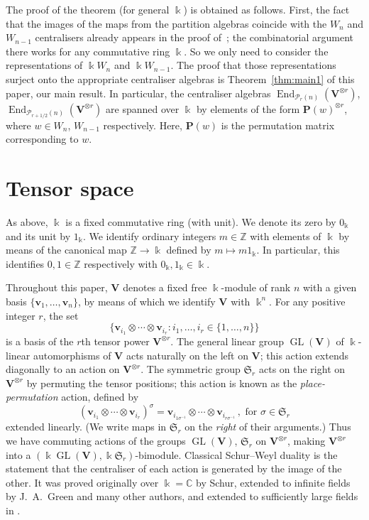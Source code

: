 \documentclass[10pt]{article}
\theoremstyle{definition}
\DeclareMathOperator{\GL}{GL}
\DeclareMathOperator{\End}{End}
\newcommand{\Z}{\mathbb{Z}}
\newcommand{\C}{\mathbb{C}}
\newcommand{\Sym}{\mathfrak{S}}
\newcommand{\Ptn}{\mathcal{P}}
\newcommand{\bP}{\mathbf{P}}
\newcommand{\V}{\mathbf{V}} %
\newcommand{\bv}{\mathbf{v}} %
\begin{document}
The proof of the theorem (for general $\Bbbk$) is obtained as
follows. First, the fact that the images of the maps from the
partition algebras coincide with the $W_n$ and $W_{n-1}$ centralisers
already appears in the proof of~\cite[Thm.~3.6]{HR-2005}; the
combinatorial argument there works for any commutative ring
$\Bbbk$. So we only need to consider the representations of $\Bbbk
W_n$ and $\Bbbk W_{n-1}$. The proof that those representations surject
onto the appropriate centraliser algebras is Theorem~\ref{thm:main1}
of this paper, our main result. In particular, the centraliser
algebras $\End_{\Ptn_r(n)}(\V^{\otimes r})$,
$\End_{\Ptn_{r+1/2}(n)}(\V^{\otimes r})$ are spanned over $\Bbbk$ by
elements of the form $\bP(w)^{\otimes r}$, where $w \in W_n$,
$W_{n-1}$ respectively. Here, $\bP(w)$ is the permutation matrix
corresponding to $w$.

\section{Tensor space}\label{sec:bimodules}%
As above, $\Bbbk$ is a fixed commutative ring (with unit). We denote
its zero by $0_\Bbbk$ and its unit by $1_\Bbbk$. We identify ordinary
integers $m \in \Z$ with elements of $\Bbbk$ by means of the canonical
map $\Z \to \Bbbk$ defined by $m \mapsto m 1_\Bbbk$. In particular,
this identifies $0,1 \in \Z$ respectively with $0_\Bbbk, 1_\Bbbk \in
\Bbbk$.

Throughout this paper, $\V$ denotes a fixed free $\Bbbk$-module of
rank $n$ with a given basis $\{\bv_1, \dots, \bv_n\}$, by means of which
we identify $\V$ with $\Bbbk^n$. For any positive integer $r$, the set
\begin{equation}\label{eq:TS-basis}
\{ \bv_{i_1} \otimes \cdots \otimes \bv_{i_r} :
 i_1,\dots, i_r \in \{ 1,
\dots, n\} \}
\end{equation}
is a basis of the $r$th tensor power $\V^{\otimes r}$. The general
linear group $\GL(\V)$ of $\Bbbk$-linear automorphisms of $\V$ acts
naturally on the left on $\V$; this action extends diagonally to an
action on $\V^{\otimes r}$. The symmetric group $\Sym_r$ acts on the
right on $\V^{\otimes r}$ by permuting the tensor positions; this
action is known as the \emph{place-permutation} action, defined by
\begin{equation}\label{eq:PP-action}
(\bv_{i_1} \otimes \cdots \otimes \bv_{i_r})^\sigma = \bv_{i_{1 \sigma^{-1}}}
\otimes \cdots \otimes \bv_{i_{r \sigma^{-1}}} \, , \text{ for } \sigma \in
\Sym_r
\end{equation}
extended linearly. (We write maps in $\Sym_r$ on the \emph{right} of
their arguments.) Thus we have commuting actions of the groups
$\GL(\V)$, $\Sym_r$ on $\V^{\otimes r}$, making $\V^{\otimes r}$ into
a $(\Bbbk \GL(\V), \Bbbk \Sym_r)$-bimodule. Classical Schur--Weyl
duality is the statement that the centraliser of each action is
generated by the image of the other. It was proved originally over
$\Bbbk = \C$ by Schur, extended to infinite fields by J.~A.~Green and
many other authors, and extended to sufficiently large fields in
\cite{Benson-Doty}.
\end{document}

